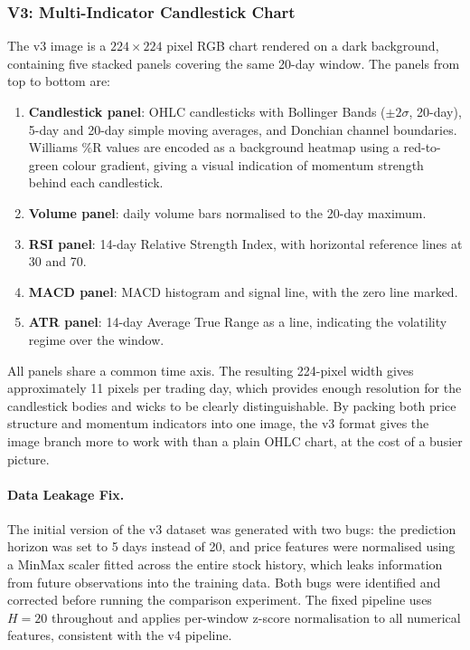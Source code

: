 \subsubsection{V3: Multi-Indicator Candlestick Chart}
\label{sec:v3image}

The v3 image is a $224 \times 224$ pixel RGB chart rendered on a dark background, containing five stacked panels covering the same 20-day window. The panels from top to bottom are:

\begin{enumerate}
    \item \textbf{Candlestick panel}: OHLC candlesticks with Bollinger Bands ($\pm 2\sigma$, 20-day), 5-day and 20-day simple moving averages, and Donchian channel boundaries. Williams \%R values are encoded as a background heatmap using a red-to-green colour gradient, giving a visual indication of momentum strength behind each candlestick.
    \item \textbf{Volume panel}: daily volume bars normalised to the 20-day maximum.
    \item \textbf{RSI panel}: 14-day Relative Strength Index, with horizontal reference lines at 30 and 70.
    \item \textbf{MACD panel}: MACD histogram and signal line, with the zero line marked.
    \item \textbf{ATR panel}: 14-day Average True Range as a line, indicating the volatility regime over the window.
\end{enumerate}

All panels share a common time axis. The resulting 224-pixel width gives approximately 11 pixels per trading day, which provides enough resolution for the candlestick bodies and wicks to be clearly distinguishable. By packing both price structure and momentum indicators into one image, the v3 format gives the image branch more to work with than a plain OHLC chart, at the cost of a busier picture.

\paragraph{Data Leakage Fix.}
The initial version of the v3 dataset was generated with two bugs: the prediction horizon was set to 5 days instead of 20, and price features were normalised using a MinMax scaler fitted across the entire stock history, which leaks information from future observations into the training data. Both bugs were identified and corrected before running the comparison experiment. The fixed pipeline uses $H = 20$ throughout and applies per-window z-score normalisation to all numerical features, consistent with the v4 pipeline.

